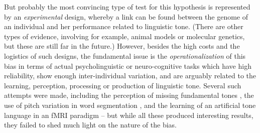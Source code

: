 \documentclass[twoside,onecolumn]{article}
\begin{document}
But probably the most convincing type of test for this hypothesis is represented by an \emph{experimental} design, whereby a link can be found between the genome of an individual and her performance related to linguistic tone.
(There are other types of evidence, involving for example, animal models or molecular genetics, but these are still far in the future.)
However, besides the high costs and the logistics of such designs, the fundamental issue is the \emph{operationalization} of this bias in terms of actual psycholinguistic or neuro-cognitive tasks which have high reliability, show enough inter-individual variation, and are arguably related to the learning, perception, processing or production of linguistic tone.
Several such attempts were made, including the perception of missing fundamental tones \citep{ladd_missingfund_2013}, the use of pitch variation in word segmentation \citep{caldwellharris_factors_2015}, and the learning of an artificial tone language in an fMRI paradigm \citep{asaridou_repetition_2016} -- but while all these produced interesting results, they failed to shed much light on the nature of the bias.
\end{document}
